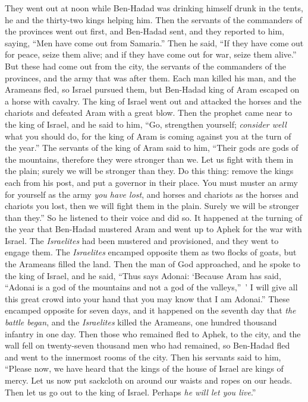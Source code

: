 \begin{biblechapter}
\verse They went out at noon while Ben-Hadad was drinking himself drunk in the tents, he and the thirty-two kings helping him.
\verse Then the servants of the commanders of the provinces went out first, and Ben-Hadad sent, and they reported to him, saying, “Men have come out from Samaria.”
\verse Then he said, “If they have come out for peace, seize them alive; and if they have come out for war, seize them alive.”
\verse But these had come out from the city, the servants of the commanders of the provinces, and the army that was after them.
\verse Each man killed his man, and the Arameans fled, so Israel pursued them, but Ben-Hadad king of Aram escaped on a horse with cavalry.
\verse The king of Israel went out and attacked the horses and the chariots and defeated Aram with a great blow.
\verse Then the prophet came near to the king of Israel, and he said to him, “Go, strengthen yourself; \textit{consider well} what you should do, for the king of Aram is coming against you at the turn of the year.”
\verse The servants of the king of Aram said to him, “Their gods are gods of the mountains, therefore they were stronger than we. Let us fight with them in the plain; surely we will be stronger than they.
\verse Do this thing: remove the kings each from his post, and put a governor in their place.
\verse You must muster an army for yourself as the army \textit{you have lost}, and horses and chariots as the horses and chariots you lost, then we will fight them in the plain. Surely we will be stronger than they.” So he listened to their voice and did so.
\verse It happened at the turning of the year that Ben-Hadad mustered Aram and went up to Aphek for the war with Israel.
\verse The \textit{Israelites} had been mustered and provisioned, and they went to engage them. The \textit{Israelites} encamped opposite them as two flocks of goats, but the Arameans filled the land.
\verse Then the man of God approached, and he spoke to the king of Israel, and he said, “Thus says Adonai: ‘Because Aram has said, “Adonai is a god of the mountains and not a god of the valleys,” ’ I will give all this great crowd into your hand that you may know that I am Adonai.”
\verse These encamped opposite for seven days, and it happened on the seventh day that \textit{the battle began}, and the \textit{Israelites} killed the Arameans, one hundred thousand infantry in one day.
\verse Then those who remained fled to Aphek, to the city, and the wall fell on twenty-seven thousand men who had remained, so Ben-Hadad fled and went to the innermost rooms of the city.
\verse Then his servants said to him, “Please now, we have heard that the kings of the house of Israel are kings of mercy. Let us now put sackcloth on around our waists and ropes on our heads. Then let us go out to the king of Israel. Perhaps \textit{he will let you live}.”

\end{biblechapter}
